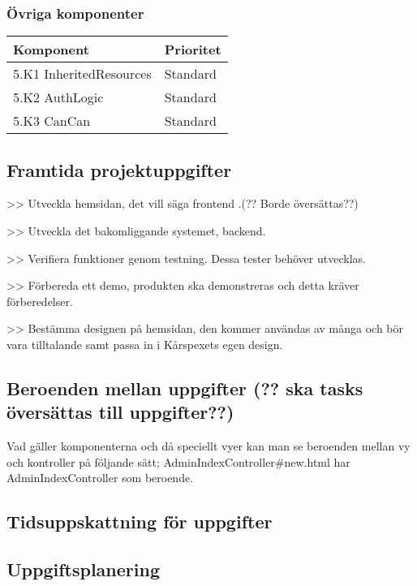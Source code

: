\documentclass[a4paper, twoside, 11pt, titlepage]{article}
\begin{document}
		\subsubsection{Övriga komponenter}


		\begin {table} [ht] \begin{tabular} {  p{3.5cm} p{9.6cm} }
			\hline
			 Komponent  &  Prioritet   \\
			\hline
			 5.K1 InheritedResources &  Standard   \\
			\hline
			 5.K2 AuthLogic  &  Standard   \\
			\hline
			 5.K3 CanCan &  Standard   \\
			\hline
		\end{tabular} \end{table} \FloatBarrier


	\subsection{Framtida projektuppgifter}


	>> Utveckla hemsidan, det vill säga frontend .(?? Borde översättas??)

	>> Utveckla det bakomliggande systemet, backend.

	>> Verifiera funktioner genom testning. Dessa tester behöver utvecklas.

	>> Förbereda ett demo, produkten ska demonstreras och detta kräver förberedelser.

	>> Bestämma designen på hemsidan, den kommer användas av många och bör vara tilltalande samt passa in i Kårspexets egen design.

	\subsection{Beroenden mellan uppgifter (?? ska tasks översättas till uppgifter??)}


	Vad gäller komponenterna och då speciellt vyer kan man se beroenden mellan vy och kontroller på följande sätt; AdminIndexController\#new.html har AdminIndexController som beroende.

	\subsection{Tidsuppskattning för uppgifter}



	\subsection{Uppgiftsplanering}
\end{document}
